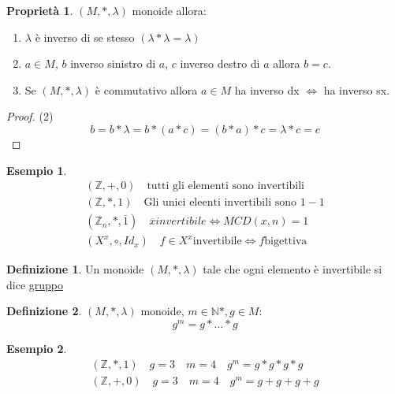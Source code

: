 \documentclass{article}
\newtheorem{exmp}{Esempio}[section]
\theoremstyle{definition}
\newtheorem{definition}{Definizione}[section]
\newtheorem{prop}{Proprietà}[section]
\begin{document}
\begin{prop}
       $ (M, *, \lambda) $ monoide allora:
       \begin{enumerate}
               \item $ \lambda $ è inverso di se stesso $ (\lambda * \lambda = \lambda) $
               \item $ a \in M $, $b$ inverso sinistro di $a$, $ c $ inverso destro di $a$ allora $ b=c $.
               \item Se $ (M,*,\lambda) $ è commutativo allora $ a \in M $ ha inverso dx $ \Leftrightarrow $ ha inverso sx.
       \end{enumerate}
\end{prop}
\begin{tcolorbox}
        
\begin{proof}
        (2)
        \begin{equation*}
                b = b * \lambda = b * (a * c) = (b * a) * c = \lambda * c = c 
        \end{equation*}
\end{proof}
\end{tcolorbox}
\begin{exmp}
       \begin{align*}
               (\mathbb{Z}, +, 0) \quad \mbox{tutti gli elementi sono invertibili} \\
               (\mathbb{Z}, *, 1) \quad \mbox{Gli unici eleenti invertibili sono } 1 -1 \\
               (\mathbb{Z}_n, *, \overline{1}) \quad \overline{x} invertibile \Leftrightarrow MCD(x,n) = 1 \\
               (X^x, \circ, Id_x) \quad f \in X^x \mbox{invertibile} \Leftrightarrow f \mbox{bigettiva}
       \end{align*} 
\end{exmp}


\begin{definition}
        Un monoide $ (M, *, \lambda) $ tale che ogni elemento è invertibile si dice \underline{gruppo} 
\end{definition}




\begin{definition}
        $ (M, *, \lambda) $ monoide, $m \in \mathbb{N}*, g \in M$:
        \begin{equation*}
                g^m = g * \ldots * g
        \end{equation*}
\end{definition}
\begin{exmp}
       \begin{align*}
               (\mathbb{Z}, *, 1) \quad g = 3 \quad m = 4 \quad g^m = g*g*g*g \\
               (\mathbb{Z}, +, 0) \quad g = 3 \quad m = 4 \quad g^m = g+g+g+g \\
       \end{align*} 
\end{exmp}
\end{document}
